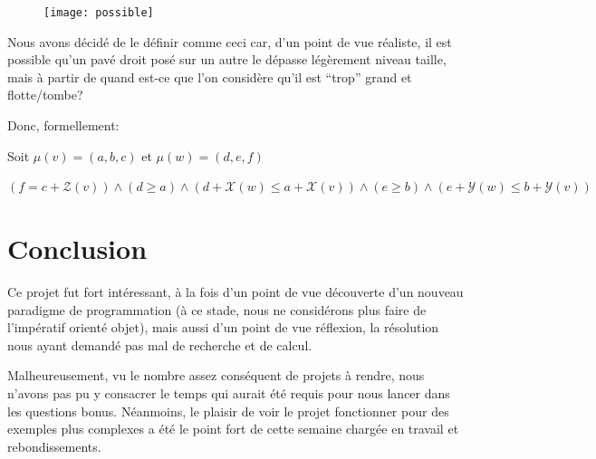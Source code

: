 \documentclass[a4paper,10pt]{article}
\begin{document}
\begin{figure}[htb!]
\centering
\texttt{[image: possible]}
\end{figure}

Nous avons décidé de le définir comme ceci car, d'un point de vue réaliste, il est possible qu'un pavé droit posé sur un autre le dépasse légèrement niveau taille, mais à partir de quand est-ce que l'on considère qu'il est ``trop'' grand et flotte/tombe?

Donc, formellement:

Soit $\mu(v) = (a,b,c)$ et $\mu(w) = (d,e,f)$

$(f = c + \mathcal{Z}(v)) \land (d \geq a) \land (d+\mathcal{X}(w) \leq a+\mathcal{X}(v)) \land (e \geq b) \land(e+\mathcal{Y}(w) \leq b+\mathcal{Y}(v))$

\section{Conclusion}

Ce projet fut fort intéressant, à la fois d'un point de vue découverte d'un nouveau paradigme de programmation (à ce stade, nous ne considérons plus faire de l'impératif orienté objet), mais aussi d'un point de vue réflexion, la résolution nous ayant demandé pas mal de recherche et de calcul.

Malheureusement, vu le nombre assez conséquent de projets à rendre, nous n'avons pas pu y consacrer le temps qui aurait été requis pour nous lancer dans les questions bonus. Néanmoins, le plaisir de voir le projet fonctionner pour des exemples plus complexes a été le point fort de cette semaine chargée en travail et rebondissements.
\end{document}
